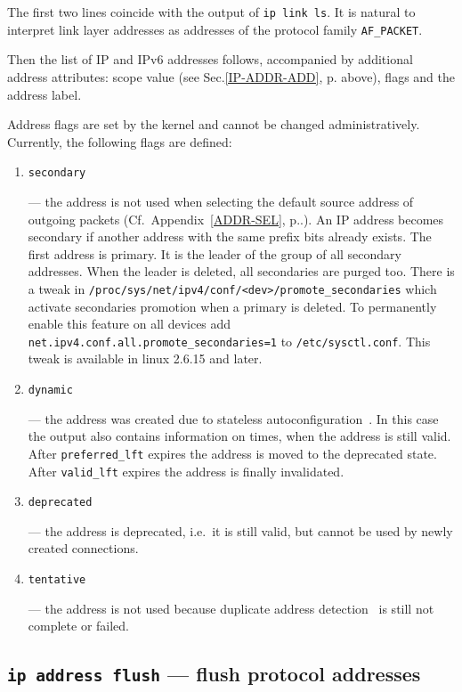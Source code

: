 The first two lines coincide with the output of \verb|ip link ls|.
It is natural to interpret link layer addresses
as addresses of the protocol family \verb|AF_PACKET|.

Then the list of IP and IPv6 addresses follows, accompanied by
additional address attributes: scope value (see Sec.\ref{IP-ADDR-ADD},
p.\pageref{IP-ADDR-ADD} above), flags and the address label.

Address flags are set by the kernel and cannot be changed
administratively. Currently, the following flags are defined:

\begin{enumerate}
\item \verb|secondary|

--- the address is not used when selecting the default source address
of outgoing packets (Cf.\ Appendix~\ref{ADDR-SEL}, p.\pageref{ADDR-SEL}.).
An IP address becomes secondary if another address with the same
prefix bits already exists. The first address is primary.
It is the leader of the group of all secondary addresses. When the leader
is deleted, all secondaries are purged too.
There is a tweak in \verb|/proc/sys/net/ipv4/conf/<dev>/promote_secondaries|
which activate secondaries promotion when a primary is deleted.
To permanently enable this feature on all devices add
\verb|net.ipv4.conf.all.promote_secondaries=1| to \verb|/etc/sysctl.conf|.
This tweak is available in linux 2.6.15 and later.


\item \verb|dynamic|

--- the address was created due to stateless autoconfiguration~\cite{RFC-ADDRCONF}.
In this case the output also contains information on times, when
the address is still valid. After \verb|preferred_lft| expires the address is
moved to the deprecated state. After \verb|valid_lft| expires the address
is finally invalidated.

\item \verb|deprecated|

--- the address is deprecated, i.e.\ it is still valid, but cannot
be used by newly created connections.

\item \verb|tentative|

--- the address is not used because duplicate address detection~\cite{RFC-ADDRCONF}
is still not complete or failed.

\end{enumerate}


\subsection{{\tt ip address flush} --- flush protocol addresses}
\label{IP-ADDR-FLUSH}

